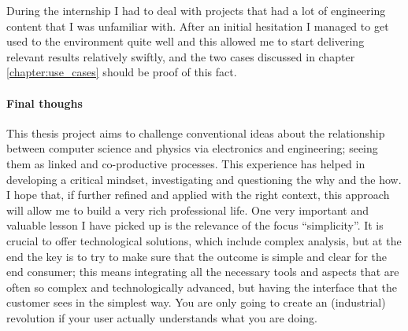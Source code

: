 During the internship I had to deal with projects that had a lot of engineering content that I was unfamiliar with. 
After an initial hesitation I managed to get used to the environment quite well and this allowed me to start delivering relevant results relatively swiftly, 
and the two cases discussed in chapter \ref{chapter:use_cases} should be proof of this fact.

\paragraph{Final thoughs}
This thesis project aims to challenge conventional ideas about the relationship between computer science and physics via electronics and engineering; seeing them as linked and co-productive processes. 
This experience has helped in developing a critical mindset, investigating and questioning the why and the how. I hope that, if further refined and applied with the right context, this approach will allow me to build a very rich professional life.
One very important and valuable lesson I have picked up is the relevance of the focus ``simplicity''. It is crucial to offer technological solutions, which include complex analysis, but at the end the key is to try to make sure that the outcome is simple and clear for the end consumer; 
this means integrating all the necessary tools and aspects that are often so complex and technologically advanced, but having the interface that the customer sees in the simplest way. 
You are only going to create an (industrial) revolution if your user actually understands what you are doing.
